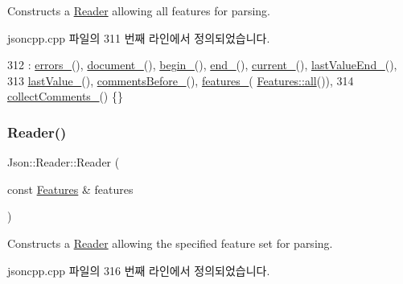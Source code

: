 Constructs a \hyperlink{class_json_1_1_reader}{Reader} allowing all features for parsing. 



jsoncpp.\+cpp 파일의 311 번째 라인에서 정의되었습니다.


\begin{DoxyCode}
312     : \hyperlink{class_json_1_1_reader_a1bbce45dc4df753bed60c129f4b5147c}{errors\_}(), \hyperlink{class_json_1_1_reader_abf99e137bc92a93623dc97598702261a}{document\_}(), \hyperlink{class_json_1_1_reader_a327166839022ea91f0a8290960a8af76}{begin\_}(), \hyperlink{class_json_1_1_reader_a714793579cbf4ee7c5a7223d2c8d77c1}{end\_}(), 
      \hyperlink{class_json_1_1_reader_a2f2feb5201a26da7aa133d2f7434479b}{current\_}(), \hyperlink{class_json_1_1_reader_a497a114f7b760f1b794b8fff9876615a}{lastValueEnd\_}(),
313       \hyperlink{class_json_1_1_reader_a87cc75ae5adc6a6755f0ba1c7255ff6c}{lastValue\_}(), \hyperlink{class_json_1_1_reader_af777967adaf0b2e882efa07673754381}{commentsBefore\_}(), \hyperlink{class_json_1_1_reader_aa9984ff8f519b5541346157b7aebf97b}{features\_}(
      \hyperlink{class_json_1_1_features_a63894da6e2c100b38741fa933f3d33ae}{Features::all}()),
314       \hyperlink{class_json_1_1_reader_a8e9ce743f6004f0596692f0a9ee4626c}{collectComments\_}() \{\}
\end{DoxyCode}
\mbox{\label{class_json_1_1_reader_a45f17831118337309180313e93ac33f8}} 
\subsubsection{\texorpdfstring{Reader()}{Reader()}\hspace{0.1cm}{\footnotesize\ttfamily [2/2]}}
{\footnotesize\ttfamily Json\+::\+Reader\+::\+Reader (\begin{DoxyParamCaption}\item[{const \hyperlink{class_json_1_1_features}{Features} \&}]{features }\end{DoxyParamCaption})}



Constructs a \hyperlink{class_json_1_1_reader}{Reader} allowing the specified feature set for parsing. 



jsoncpp.\+cpp 파일의 316 번째 라인에서 정의되었습니다.


